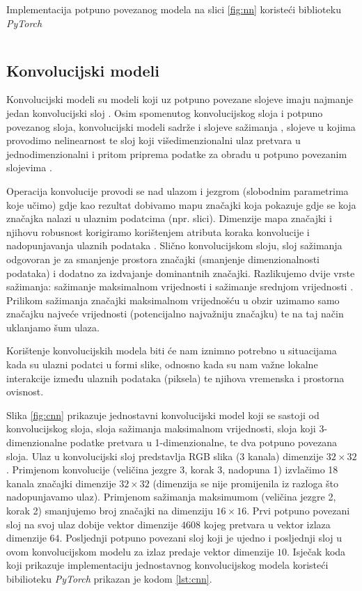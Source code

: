 \begin{listing}[H]
    \caption{Implementacija potpuno povezanog modela na slici \ref{fig:nn} koristeći biblioteku \textit{PyTorch}}
    \inputminted{python}{snippets/fcn.py}
    \label{lst:fcn}
\end{listing}

\subsection{Konvolucijski modeli}

Konvolucijski modeli  su modeli koji uz potpuno povezane slojeve imaju najmanje jedan konvolucijski sloj . Osim spomenutog konvolucijskog sloja i potpuno povezanog sloja, konvolucijski modeli sadrže i slojeve sažimanja , slojeve u kojima provodimo nelinearnost te sloj koji višedimenzionalni ulaz pretvara u jednodimenzionalni i pritom priprema podatke za obradu u potpuno povezanim slojevima .

Operacija konvolucije provodi se nad ulazom i jezgrom  (slobodnim parametrima koje učimo) gdje kao rezultat dobivamo mapu značajki koja pokazuje gdje se koja značajka nalazi u ulaznim podatcima (npr. slici). Dimenzije mapa značajki i njihovu robusnost korigiramo korištenjem atributa koraka konvolucije  i nadopunjavanja ulaznih podataka . Slično konvolucijskom sloju, sloj sažimanja odgovoran je za smanjenje prostora značajki (smanjenje dimenzionalnosti podataka) i dodatno za izdvajanje dominantnih značajki. Razlikujemo dvije vrste sažimanja: sažimanje maksimalnom vrijednosti  i sažimanje srednjom vrijednosti . Prilikom sažimanja značajki maksimalnom vrijednošću u obzir uzimamo samo značajku najveće vrijednosti (potencijalno najvažniju značajku) te na taj način uklanjamo šum ulaza.

Korištenje konvolucijskih modela biti će nam iznimno potrebno u situacijama kada su ulazni podatci u formi slike, odnosno kada su nam važne lokalne interakcije između ulaznih podataka (piksela) te njihova vremenska i prostorna ovisnost.

Slika \ref{fig:cnn} prikazuje jednostavni konvolucijski model koji se sastoji od konvolucijskog sloja, sloja sažimanja maksimalnom vrijednosti, sloja koji 3-dimenzionalne podatke pretvara u 1-dimenzionalne, te dva potpuno povezana sloja. Ulaz u konvolucijski sloj predstavlja RGB slika (3 kanala) dimenzije $32 \times 32$. Primjenom konvolucije (veličina jezgre 3, korak 3, nadopuna 1) izvlačimo 18 kanala značajki dimenzije $32 \times 32$ (dimenzija se nije promijenila iz razloga što nadopunjavamo ulaz). Primjenom sažimanja maksimumom (veličina jezgre 2, korak 2) smanjujemo broj značajki na dimenziju $16 \times 16$. Prvi potpuno povezani sloj na svoj ulaz dobije vektor dimenzije $4608$ kojeg pretvara u vektor izlaza dimenzije $64$. Posljednji potpuno povezani sloj koji je ujedno i posljednji sloj u ovom konvolucijskom modelu za izlaz predaje vektor dimenzije $10$. Isječak koda koji prikazuje implementaciju jednostavnog konvolucijskog modela koristeći bibilioteku \textit{PyTorch} prikazan je kodom \ref{lst:cnn}.

